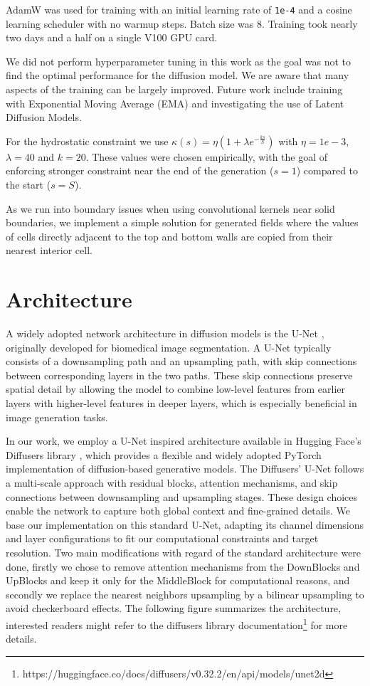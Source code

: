 AdamW was used for training with an initial learning rate of \texttt{1e-4} and a cosine learning scheduler with no warmup steps. Batch size was 8. Training took nearly two days and a half on a single V100 GPU card.

We did not perform hyperparameter tuning in this work as the goal was not to find the optimal performance for the diffusion model. We are aware that many aspects of the training can be largely improved. Future work include training with Exponential Moving Average (EMA) and investigating the use of Latent Diffusion Models.


For the hydrostatic constraint we use $\kappa(s) = \eta (1 + \lambda e^{-\frac{ks}{S}})$ with $\eta=1e-3$, $\lambda=40$ and $k=20$. These values were chosen empirically, with the goal of enforcing stronger constraint near the end of the generation ($s=1$) compared to the start ($s=S$).

As we run into boundary issues when using convolutional kernels near solid boundaries, we implement a simple solution for generated fields where the values of cells directly adjacent to the top and bottom walls are copied from their nearest interior cell.


\section{Architecture}
\label{appendix:architecture}
A widely adopted network architecture in diffusion models is the U-Net \citep{ronneberger2015u}, originally developed for biomedical image segmentation. A U-Net typically consists of a downsampling path and an upsampling path, with skip connections between corresponding layers in the two paths. These skip connections preserve spatial detail by allowing the model to combine low-level features from earlier layers with higher-level features in deeper layers, which is especially beneficial in image generation tasks. 

In our work, we employ a U-Net inspired architecture available in Hugging Face’s Diffusers library \citep{von-platen-etal-2022-diffusers}, which provides a flexible and widely adopted PyTorch implementation of diffusion-based generative models. The Diffusers' U-Net follows a multi-scale approach with residual blocks, attention mechanisms, and skip connections between downsampling and upsampling stages. These design choices enable the network to capture both global context and fine-grained details. We base our implementation on this standard U-Net, adapting its channel dimensions and layer configurations to fit our computational constraints and target resolution. Two main modifications with regard of the standard architecture were done, firstly we chose to remove attention mechanisms from the DownBlocks and UpBlocks and keep it only for the MiddleBlock for computational reasons, and secondly we replace the nearest neighbors upsampling by a bilinear upsampling to avoid checkerboard effects. The following figure summarizes the architecture, interested readers might refer to the diffusers library documentation\footnote{https://huggingface.co/docs/diffusers/v0.32.2/en/api/models/unet2d} for more details.

